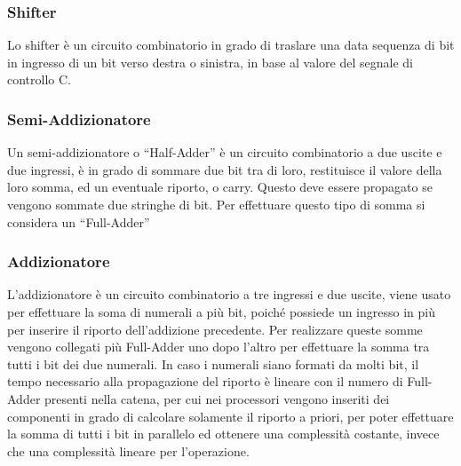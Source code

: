 \documentclass{article}
\numberwithin{equation}{subsection}
\begin{document}

\subsubsection{Shifter}

Lo shifter è un circuito combinatorio in grado di traslare una data sequenza di bit in ingresso di un bit verso destra o sinistra, in base al valore del segnale di controllo C. 


\subsubsection{Semi-Addizionatore}

Un semi-addizionatore o ``Half-Adder'' è un circuito combinatorio a due uscite e due ingressi, è in grado di sommare due bit tra di loro, restituisce il valore della loro somma, ed un eventuale riporto, o carry. Questo deve 
essere propagato se vengono sommate due stringhe di bit. Per effettuare questo tipo di somma si considera un ``Full-Adder''


\subsubsection{Addizionatore}

L'addizionatore è un circuito combinatorio a tre ingressi e due uscite, viene usato per effettuare la soma di numerali a più bit, poiché possiede un ingresso in più per inserire il riporto dell'addizione 
precedente. Per realizzare queste somme vengono collegati più Full-Adder uno dopo l'altro per effettuare la somma tra tutti i bit dei due numerali. In caso i numerali siano formati da molti bit, il tempo 
necessario alla propagazione del riporto è lineare con il numero di Full-Adder presenti nella catena, per cui nei processori vengono inseriti dei componenti in grado di calcolare solamente il riporto a priori, per 
poter effettuare la somma di tutti i bit in parallelo ed ottenere una complessità costante, invece che una complessità lineare per l'operazione. 

\end{document}
